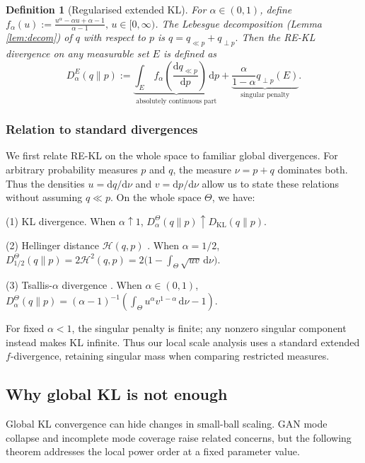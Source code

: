 \documentclass[11pt,a4paper]{article}
\theoremstyle{compactplain}
\theoremstyle{compactdefinition}
\newtheorem{definition}[theorem]{Definition}
\numberwithin{equation}{section}
\begin{document}
\begin{definition}[Regularised extended KL]
For \(\alpha\in(0,1)\), define
\(f_\alpha(u) :=\frac {u^\alpha-\alpha u+\alpha-1}{{\alpha-1}}, \, u\in[0,\infty)\).
The Lebesgue decomposition (Lemma \ref{lem:decom}) of $q$ with respect to $p$ is
$
q=q_{\ll p}+q_{\perp p}.
$
Then the RE-KL divergence on any measurable set $E$ is defined as
\[
D_\alpha^E(q\|p):=\underbrace{\int_E\,f_\alpha\left(\frac{\mathrm dq_{\ll p}}{\mathrm dp}\right)\,\mathrm dp}_\text{absolutely continuous part}+\underbrace{\frac{\alpha}{1-\alpha}q_{\perp p}(E)}_\text{singular penalty}.
\]
\end{definition}

\subsubsection{Relation to standard divergences}

We first relate RE-KL on the whole space to familiar global
divergences. For arbitrary probability measures \(p\) and \(q\),
the measure \(\nu=p+q\) dominates both. Thus the densities
\(u=\mathrm dq/\mathrm d\nu\) and \(v=\mathrm dp/\mathrm d\nu\)
allow us to state these relations without assuming \(q\ll p\).
On the whole space \(\Theta\), we have:

\noindent\textup{(1) KL divergence.} When $\alpha\uparrow 1$, 
\(D_\alpha^\Theta(q\|p)\uparrow D_{\mathrm{KL}}(q\|p)\).

\noindent\textup{(2) Hellinger distance $\mathcal H(q,p)$ \cite{beran1977minimum}.} When $\alpha=1/2$, \(D_{1/2}^\Theta(q\|p)\allowbreak=2\mathcal H^2(q,p)=2\bigl(1-\int_\Theta \sqrt{uv}\,\mathrm d\nu\bigr)\).

\noindent\textup{(3) Tsallis-$\alpha$ divergence \cite{poczos2011estimation}.} When $\alpha\allowbreak\in(0,1)$, 
$
D_{\alpha}^\Theta(q\|p) = (\alpha-1)^{-1}
\left(
\int_{\Theta} u^\alpha v^{1-\alpha}\,\mathrm d\nu\allowbreak
-1
\right).
$

For fixed \(\alpha<1\), the singular penalty is finite; any nonzero singular component instead makes KL infinite. Thus our local scale analysis uses a standard extended \(f\)-divergence, retaining singular mass when comparing restricted measures.

\subsection{Why global KL is not enough}
Global KL convergence can hide changes in small-ball scaling. GAN mode collapse \cite{lin2018pacgan} and incomplete mode coverage \cite{zhong2019rethinking} raise related concerns, but the following theorem addresses the local power order at a fixed parameter value.
\end{document}
